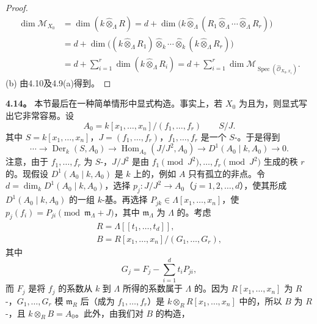 \begin{proof}
\[
\begin{aligned}
\dim\mathcal M_{X_0}
&=\dim(k\widehat\otimes_\Lambda R)
=d+\dim\bigl(k\widehat\otimes_\Lambda(R_1\widehat\otimes_\Lambda\cdots\widehat\otimes_\Lambda R_r)\bigr)\\
&=d+\dim\bigl((k\widehat\otimes_\Lambda R_1)\widehat\otimes_k\cdots\widehat\otimes_k(k\widehat\otimes_\Lambda R_r)\bigr)\\
&=d+\sum_{i=1}^r\dim(k\widehat\otimes_\Lambda R_i)
=d+\sum_{i=1}^r\dim\mathcal M_{\operatorname{Spec}(\widehat{\mathcal O}_{X_0,x_i})}.
\end{aligned}
\]
(b) 由4.10及4.9(a)得到。
\end{proof}

\textbf{4.14。} 本节最后在一种简单情形中显式构造。事实上，若 $X_0$ 为且为，则显式写出它非常容易。设
\[
A_0=k[x_1,\ldots,x_n]/(f_1,\ldots,f_r)\qquad S/J.
\]
其中 $S=k[x_1,\ldots,x_n]$，$J=(f_1,\ldots,f_r)$，$f_1,\ldots,f_r$ 是一个 $S$-。于是得到
\[
\cdots\longrightarrow\operatorname{Der}_k(S,A_0)\longrightarrow
\operatorname{Hom}_{A_0}(J/J^2,A_0)\longrightarrow D^1(A_0\mid k,A_0)\longrightarrow0.
\]
注意，由于 $f_1,\ldots,f_r$ 为 $S$-，$J/J^2$ 是由 $f_1\pmod{J^2},\ldots,f_r\pmod{J^2}$ 生成的秩 $r$ 的。现假设 $D^1(A_0\mid k,A_0)$ 是 $k$ 上的，例如 $A$ 只有孤立的非点。令 $d=\dim_kD^1(A_0\mid k,A_0)$，选择 $p_j:J/J^2\to A_0$（$j=1,2,\ldots,d$），使其形成 $D^1(A_0\mid k,A_0)$ 的一组 $k$-基。再选择 $P_{jk}\in\Lambda[x_1,\ldots,x_n]$，使 $p_j(f_i)=P_{ji}\pmod{\mathfrak m_\Lambda+J}$，其中 $\mathfrak m_\Lambda$ 为 $\Lambda$ 的。考虑
\[
\begin{gathered}
R=\Lambda[[t_1,\ldots,t_d]],\\
B=R[x_1,\ldots,x_n]/(G_1,\ldots,G_r),
\end{gathered}
\]
其中
\[
G_j=F_j-\sum_{i=1}^d t_iP_{ji},
\]
而 $F_j$ 是将 $f_j$ 的系数从 $k$ 到 $\Lambda$ 所得的系数属于 $\Lambda$ 的。因为 $R[x_1,\ldots,x_n]$ 为 $R$-，$G_1,\ldots,G_r$ 模 $\mathfrak m_R$ 后（成为 $f_1,\ldots,f_r$）是 $k\otimes_R R[x_1,\ldots,x_n]$ 中的，所以 $B$ 为 $R$-，且 $k\otimes_R B=A_0$。此外，由我们对 $B$ 的构造，
